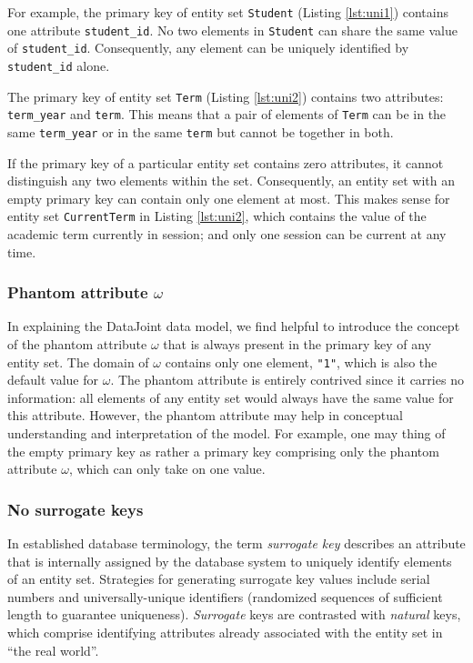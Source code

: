 \documentclass[letter,10pt]{article}
\newcommand{\datajoint}{DataJoint\xspace}
\begin{document}
For example, the primary key of entity set \lstinline$Student$ (Listing \ref{lst:uni1}) contains one attribute \lstinline$student_id$.  
No two elements in \lstinline$Student$ can share the same value of \lstinline$student_id$. 
Consequently, any element can be uniquely identified by \lstinline$student_id$ alone. 

The primary key of entity set \lstinline$Term$ (Listing \ref{lst:uni2}) contains two attributes: \lstinline$term_year$ and \lstinline$term$.
This means that a pair of elements of \lstinline$Term$ can be in the same \lstinline$term_year$ or in the same \lstinline$term$ but cannot be together in both. 

If the primary key of a particular entity set contains zero attributes, it cannot distinguish any two elements within the set.  
Consequently, an entity set with an empty primary key can contain only one element at most.
This makes sense for entity set \lstinline$CurrentTerm$ in Listing \ref{lst:uni2}, which contains the value of the academic term currently in session; and only one session can be current at any time.

\subsubsection{Phantom attribute $\omega$}\label{sec:phantom}
In explaining the \datajoint data model, we find helpful to introduce the concept of the phantom attribute $\omega$ that is always present in the primary key of any entity set.  
The domain of $\omega$ contains only one element, \lstinline$"1"$, which is also the default value for $\omega$.
The phantom attribute is entirely contrived since it carries no information: all elements of any entity set would always have the same value for this attribute.
However, the phantom attribute may help in conceptual understanding and interpretation of the model.
For example, one may thing of the empty primary key as rather a primary key comprising only the phantom attribute $\omega$, which can only take on one value.
 
\subsubsection{No surrogate keys}
In established database terminology, the term \emph{surrogate key} describes an attribute that is internally assigned by the database system to uniquely identify elements of an entity set. 
Strategies for generating surrogate key values include serial numbers and universally-unique identifiers (randomized sequences of sufficient length to guarantee uniqueness).
\emph{Surrogate} keys are contrasted with \emph{natural} keys, which comprise identifying attributes already associated with the entity set in ``the real world''.
\end{document}
